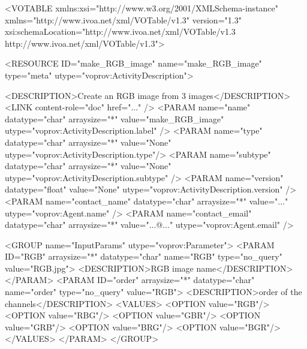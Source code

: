\begin{verbnobox}[\scriptsize]

<VOTABLE xmlns:xsi="http://www.w3.org/2001/XMLSchema-instance" 
    xmlns="http://www.ivoa.net/xml/VOTable/v1.3" version="1.3" 
    xsi:schemaLocation="http://www.ivoa.net/xml/VOTable/v1.3 
    http://www.ivoa.net/xml/VOTable/v1.3">
    
  <RESOURCE ID="make_RGB_image" name="make_RGB_image" 
      type="meta" utype="voprov:ActivityDescription">
      
    <DESCRIPTION>Create an RGB image from 3 images</DESCRIPTION>
    <LINK content-role="doc" href="..." />
    <PARAM name="name" datatype="char" arraysize="*" 
        value="make_RGB_image" utype="voprov:ActivityDescription.label" />
    <PARAM name="type" datatype="char" arraysize="*" 
        value="None" utype="voprov:ActivityDescription.type"/>
    <PARAM name="subtype" datatype="char" arraysize="*" 
        value="None" utype="voprov:ActivityDescription.subtype" />
    <PARAM name="version" datatype="float" 
        value="None" utype="voprov:ActivityDescription.version" />
    <PARAM name="contact_name" datatype="char" arraysize="*" 
        value="..." utype="voprov:Agent.name" />
    <PARAM name="contact_email" datatype="char" arraysize="*" 
        value="...@..." utype="voprov:Agent.email" />
        
    <GROUP name="InputParams" utype="voprov:Parameter">
      <PARAM ID="RGB" arraysize="*" datatype="char" name="RGB" 
          type="no_query" value="RGB.jpg">
        <DESCRIPTION>RGB image name</DESCRIPTION>
      </PARAM>
      <PARAM ID="order" arraysize="*" datatype="char" name="order" 
          type="no_query" value="RGB">
        <DESCRIPTION>order of the channels</DESCRIPTION>
        <VALUES>
          <OPTION value="RGB"/>
          <OPTION value="RBG"/>
          <OPTION value="GBR"/>
          <OPTION value="GRB"/>
          <OPTION value="BRG"/>
          <OPTION value="BGR"/>
        </VALUES>
      </PARAM>
    </GROUP>
		

\end{verbnobox}
